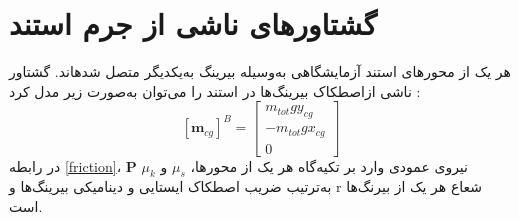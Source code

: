 \section{گشتاورهای ناشی از جرم استند}

هر یک از محورهای استند آزمایشگاهی به‌وسیله بیرینگ به‌یکدیگر متصل شدهاند. گشتاور ناشی ازاصطکاک بیرینگ‌ها در استند را می‌توان به‌صورت زیر مدل کرد
\cite{Arabolye}
:
\begin{equation}\label{mg}
	[\boldsymbol m_ {cg}]^B = \begin{bmatrix}
		m_{tot}gy_{cg} \\
		-m_{tot}gx_{cg} \\
		0
	\end{bmatrix}
\end{equation}
در رابطه \ref{friction}، $\boldsymbol P$ نیروی عمودی وارد بر تکیه‌گاه هر یک از محورها، $\mu_s$ و $\mu_k$ به‌ترتیب ضریب اصطکاک
ایستایی و دینامیکی بیرینگ‌ها و r شعاع هر یک از بیرنگ‌ها است.
